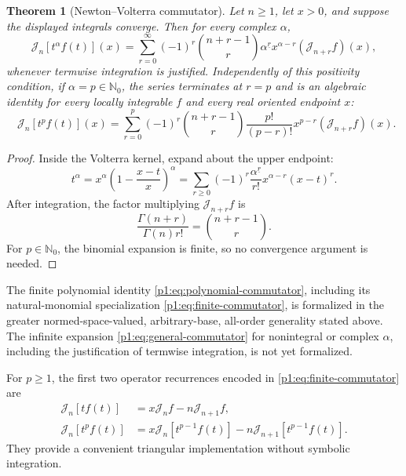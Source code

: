 \documentclass[11pt,oneside]{article}
\newtheorem{theorem}{Theorem}[section]
\theoremstyle{definition}
\theoremstyle{remark}
\newcommand{\N}{\mathbb N}
\newcommand{\fall}[2]{#1^{\underline{#2}}}
\newcommand{\Jn}{\mathcal J}
\newcommand{\1}{\mathbf 1}
\begin{document}
\begin{theorem}[Newton--Volterra commutator]\label{p1:thm:commutator}
Let \(n\geq1\), let \(x>0\), and suppose the displayed integrals converge.
Then for every complex \(\alpha\),
\begin{equation}
 \Jn_n[t^\alpha f(t)](x)
 =\sum_{r=0}^{\infty}(-1)^r\binom{n+r-1}{r}\fall{\alpha}{r}
 x^{\alpha-r}(\Jn_{n+r}f)(x),                                 \label{p1:eq:general-commutator}
\end{equation}
whenever termwise integration is justified.  Independently of this
positivity condition, if \(\alpha=p\in\N_0\), the series terminates at
\(r=p\) and is an algebraic identity for every locally integrable \(f\) and
every real oriented endpoint \(x\):
\begin{equation}
 \boxed{\quad
 \Jn_n[t^pf(t)](x)
 =\sum_{r=0}^{p}(-1)^r\binom{n+r-1}{r}\frac{p!}{(p-r)!}
 x^{p-r}(\Jn_{n+r}f)(x).
 \quad}                                                        \label{p1:eq:finite-commutator}
\end{equation}
\end{theorem}

\begin{proof}
Inside the Volterra kernel, expand about the upper endpoint:
\[
 t^\alpha=x^\alpha\left(1-\frac{x-t}{x}\right)^\alpha
 =\sum_{r\geq0}(-1)^r\frac{\fall{\alpha}{r}}{r!}
 x^{\alpha-r}(x-t)^r.
\]
After integration, the factor multiplying \(\Jn_{n+r}f\) is
\[
 \frac{\Gamma(n+r)}{\Gamma(n)r!}
 =\binom{n+r-1}{r}.
\]
For \(p\in\N_0\), the binomial expansion is finite, so no convergence
argument is needed.
\end{proof}

\begin{statusbox}
The finite polynomial identity \eqref{p1:eq:polynomial-commutator}, including its
natural-monomial specialization \eqref{p1:eq:finite-commutator}, is formalized in
the greater normed-space-valued, arbitrary-base, all-order generality stated
above.
The infinite expansion \eqref{p1:eq:general-commutator} for nonintegral or complex
\(\alpha\), including the justification of termwise integration, is not yet
formalized.
\end{statusbox}

For \(p\geq1\), the first two operator recurrences encoded in
\eqref{p1:eq:finite-commutator} are
\begin{align}
 \Jn_n[t f(t)]&=x\Jn_nf-n\Jn_{n+1}f,                            \label{p1:eq:xf-rec}\\
 \Jn_n[t^pf(t)]&=x\Jn_n[t^{p-1}f(t)]-n\Jn_{n+1}[t^{p-1}f(t)].   \label{p1:eq:triangular-rec}
\end{align}
They provide a convenient triangular implementation without symbolic
integration.
\end{document}
